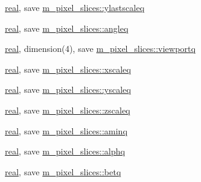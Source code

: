 \begin{DoxyCompactItemize}
\item 
\hyperlink{read__watch_83_8txt_abdb62bde002f38ef75f810d3a905a823}{real}, save \hyperlink{namespacem__pixel__slices_a15c58d927d442047ca7d648b32b0971a}{m\+\_\+pixel\+\_\+slices\+::ylastscaleq}
\item 
\hyperlink{read__watch_83_8txt_abdb62bde002f38ef75f810d3a905a823}{real}, save \hyperlink{namespacem__pixel__slices_ad82933d6a03faeb06a790664ed1e4cb7}{m\+\_\+pixel\+\_\+slices\+::angleq}
\item 
\hyperlink{read__watch_83_8txt_abdb62bde002f38ef75f810d3a905a823}{real}, dimension(4), save \hyperlink{namespacem__pixel__slices_a46f6b80eeb99ecff5fd18e41d1b17f0a}{m\+\_\+pixel\+\_\+slices\+::viewportq}
\item 
\hyperlink{read__watch_83_8txt_abdb62bde002f38ef75f810d3a905a823}{real}, save \hyperlink{namespacem__pixel__slices_aea975665739d351db83cfcc41e1914db}{m\+\_\+pixel\+\_\+slices\+::xscaleq}
\item 
\hyperlink{read__watch_83_8txt_abdb62bde002f38ef75f810d3a905a823}{real}, save \hyperlink{namespacem__pixel__slices_aff993c23736cb8fc57b8b3ebe5021ba5}{m\+\_\+pixel\+\_\+slices\+::yscaleq}
\item 
\hyperlink{read__watch_83_8txt_abdb62bde002f38ef75f810d3a905a823}{real}, save \hyperlink{namespacem__pixel__slices_af1ea5e682e81c2984c650485935a93e8}{m\+\_\+pixel\+\_\+slices\+::zscaleq}
\item 
\hyperlink{read__watch_83_8txt_abdb62bde002f38ef75f810d3a905a823}{real}, save \hyperlink{namespacem__pixel__slices_ae256fff4bec0279eb4e2439eb3973a1f}{m\+\_\+pixel\+\_\+slices\+::aminq}
\item 
\hyperlink{read__watch_83_8txt_abdb62bde002f38ef75f810d3a905a823}{real}, save \hyperlink{namespacem__pixel__slices_a72bdfc50e6b4b5a8b123083e4e529e9c}{m\+\_\+pixel\+\_\+slices\+::alphq}
\item 
\hyperlink{read__watch_83_8txt_abdb62bde002f38ef75f810d3a905a823}{real}, save \hyperlink{namespacem__pixel__slices_ab90a7c0b6645a0405a9c5e9feff7b153}{m\+\_\+pixel\+\_\+slices\+::betq}
\end{DoxyCompactItemize}
